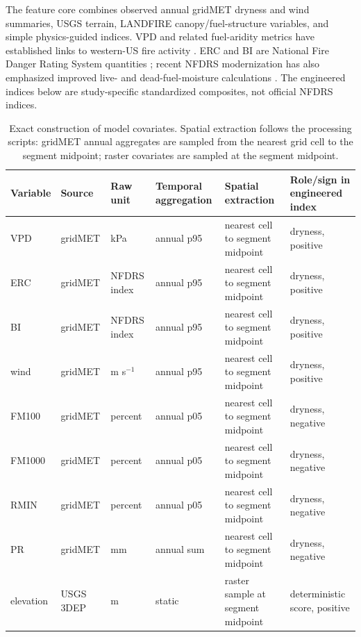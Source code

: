 \documentclass[11pt]{article}
\begin{document}
The feature core combines observed annual gridMET dryness and wind summaries,
USGS terrain, LANDFIRE canopy/fuel-structure variables, and simple
physics-guided indices. VPD and related fuel-aridity metrics have established
links to western-US fire activity \citep{abatzoglouWilliams2016wildfire}. ERC
and BI are National Fire Danger Rating System quantities
\citep{deeming1977nfdrs}; recent NFDRS modernization has also emphasized
improved live- and dead-fuel-moisture calculations \citep{jolly2024nfdrs}. The
engineered indices below are study-specific standardized composites, not
official NFDRS indices.

\begin{table}[!htbp]
  \centering
  \scriptsize
  \setlength{\tabcolsep}{2pt}
  \caption{Exact construction of model covariates. Spatial extraction follows the processing scripts: gridMET annual aggregates are sampled from the nearest grid cell to the segment midpoint; raster covariates are sampled at the segment midpoint.}
  \label{tab:covariate-construction}
  \begin{tabular}{L{0.14\textwidth} L{0.11\textwidth} L{0.15\textwidth} L{0.17\textwidth} L{0.17\textwidth} L{0.17\textwidth}}
    \toprule
    Variable & Source & Raw unit & Temporal aggregation & Spatial extraction & Role/sign in engineered index \\
    \midrule
    VPD & gridMET & kPa & annual p95 & nearest cell to segment midpoint & dryness, positive \\
    ERC & gridMET & NFDRS index & annual p95 & nearest cell to segment midpoint & dryness, positive \\
    BI & gridMET & NFDRS index & annual p95 & nearest cell to segment midpoint & dryness, positive \\
    wind & gridMET & m s$^{-1}$ & annual p95 & nearest cell to segment midpoint & dryness, positive \\
    FM100 & gridMET & percent & annual p05 & nearest cell to segment midpoint & dryness, negative \\
    FM1000 & gridMET & percent & annual p05 & nearest cell to segment midpoint & dryness, negative \\
    RMIN & gridMET & percent & annual p05 & nearest cell to segment midpoint & dryness, negative \\
    PR & gridMET & mm & annual sum & nearest cell to segment midpoint & dryness, negative \\
    elevation & USGS 3DEP & m & static & raster sample at segment midpoint & deterministic score, positive \\

\end{tabular}
\end{table}
\end{document}
